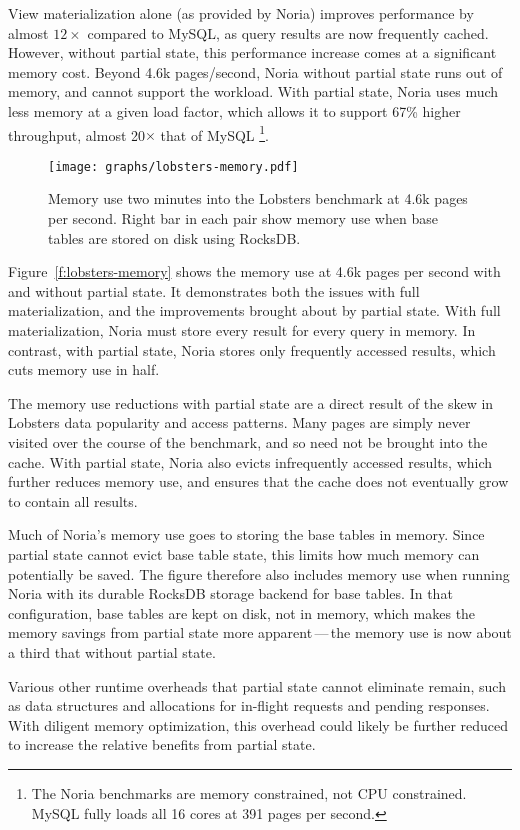 View materialization alone (as provided by Noria) improves performance by almost
$12\times$ compared to MySQL, as query results are now frequently cached.
However, without partial state, this performance increase comes at a significant
memory cost. Beyond 4.6k pages/second, Noria without partial state runs out of
memory, and cannot support the workload. With partial state, Noria uses much
less memory at a given load factor, which allows it to support 67\% higher
throughput, almost 20$\times$ that of MySQL%
\footnote{The Noria benchmarks are memory constrained, not CPU constrained.
MySQL fully loads all 16 cores at 391 pages per second.}.

\begin{figure}[h]
  \centering
  \texttt{[image: graphs/lobsters-memory.pdf]}
  \caption{Memory use two minutes into the Lobsters benchmark at 4.6k pages per
  second. Right bar in each pair show memory use when base tables are stored on
  disk using RocksDB.}
  \label{f:lobsters-memory}
\end{figure}

Figure~\vref{f:lobsters-memory} shows the memory use at 4.6k pages per second
with and without partial state. It demonstrates both the issues with full
materialization, and the improvements brought about by partial state. With full
materialization, Noria must store every result for every query in memory. In
contrast, with partial state, Noria stores only frequently accessed results,
which cuts memory use in half.

The memory use reductions with partial state are a direct result of the skew in
Lobsters data popularity and access patterns. Many pages are simply never
visited over the course of the benchmark, and so need not be brought into the
cache. With partial state, Noria also evicts infrequently accessed results,
which further reduces memory use, and ensures that the cache does not eventually
grow to contain all results.

Much of Noria's memory use goes to storing the base tables in memory. Since
partial state cannot evict base table state, this limits how much memory can
potentially be saved. The figure therefore also includes memory use when running
Noria with its durable RocksDB storage backend for base tables. In that
configuration, base tables are kept on disk, not in memory, which makes the
memory savings from partial state more apparent\,---\,the memory use is now
about a third that without partial state.

Various other runtime overheads that partial state cannot eliminate remain, such
as data structures and allocations for in-flight requests and pending responses.
With diligent memory optimization, this overhead could likely be further reduced
to increase the relative benefits from partial state.

